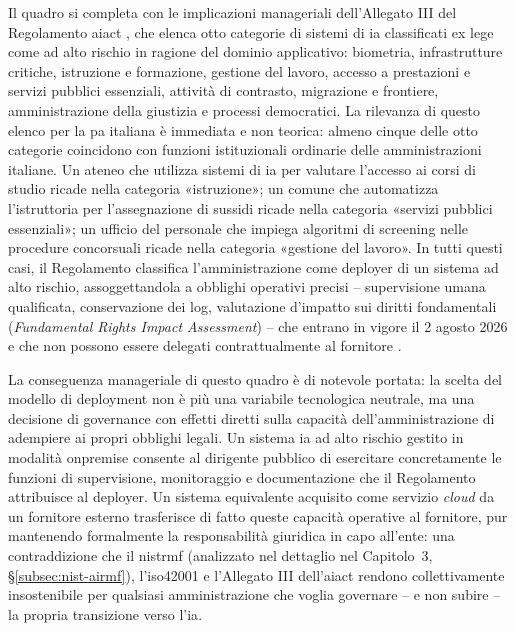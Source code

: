 Il quadro si completa con le implicazioni manageriali dell'Allegato III del Regolamento \gls{aiact} \parencite{AIAct2024}, che elenca otto categorie di sistemi di \gls{ia} classificati ex lege come ad alto rischio in ragione del dominio applicativo: biometria, infrastrutture critiche, istruzione e formazione, gestione del lavoro, accesso a prestazioni e servizi pubblici essenziali, attività di contrasto, migrazione e frontiere, amministrazione della giustizia e processi democratici. La rilevanza di questo elenco per la \gls{pa} italiana è immediata e non teorica: almeno cinque delle otto categorie coincidono con funzioni istituzionali ordinarie delle amministrazioni italiane. Un ateneo che utilizza sistemi di \gls{ia} per valutare l'accesso ai corsi di studio ricade nella categoria «istruzione»; un comune che automatizza l'istruttoria per l'assegnazione di sussidi ricade nella categoria «servizi pubblici essenziali»; un ufficio del personale che impiega algoritmi di screening nelle procedure concorsuali ricade nella categoria «gestione del lavoro». In tutti questi casi, il Regolamento classifica l'amministrazione come deployer di un sistema ad alto rischio, assoggettandola a obblighi operativi precisi -- supervisione umana qualificata, conservazione dei log, valutazione d'impatto sui diritti fondamentali (\textit{Fundamental Rights Impact Assessment}) -- che entrano in vigore il 2 agosto 2026 e che non possono essere delegati contrattualmente al fornitore \parencite{AIAct2024}.

La conseguenza manageriale di questo quadro è di notevole portata: la scelta del modello di deployment non è più una variabile tecnologica neutrale, ma una decisione di governance con effetti diretti sulla capacità dell'amministrazione di adempiere ai propri obblighi legali. Un sistema \gls{ia} ad alto rischio gestito in modalità \gls{onpremise} consente al dirigente pubblico di esercitare concretamente le funzioni di supervisione, monitoraggio e documentazione che il Regolamento attribuisce al deployer. Un sistema equivalente acquisito come servizio \textit{cloud} da un fornitore esterno trasferisce di fatto queste capacità operative al fornitore, pur mantenendo formalmente la responsabilità giuridica in capo all'ente: una contraddizione che il \gls{nistrmf} (analizzato nel dettaglio nel Capitolo~3, §\ref{subsec:nist-airmf}), l'\gls{iso42001} e l'Allegato III dell'\gls{aiact} rendono collettivamente insostenibile per qualsiasi amministrazione che voglia governare -- e non subire -- la propria transizione verso l'\gls{ia}.

